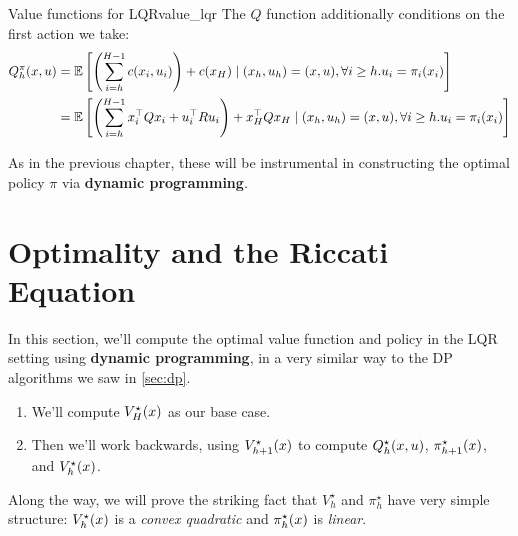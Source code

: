\documentclass[\main/main]{subfiles}
\begin{document}
\begin{definition}{Value functions for LQR}{value_lqr}
    The $Q$ function additionally conditions on the first
    action we take:
    \[
        \begin{split}
            Q^\pi_h (x, u) &= \operatorname*{\mathbb{E}} \left[ \left( \sum_{i=h}^{H-1} c(x_i, u_i) \right) + c(x_H) \mid  (x_h, u_h) = (x, u), \forall i \ge h. u_i = \pi_i(x_i) \right] \\
            &= \operatorname*{\mathbb{E}} \left[ \left( \sum_{i=h}^{H-1} x_i^\top Q x_i + u_i^\top R u_i \right) + x_H^\top Q x_H \mid (x_h, u_h) = (x, u), \forall i \ge h. u_i = \pi_i(x_i) \right] \\
        \end{split}
    \]
\end{definition}

As in the previous chapter, these will be instrumental in constructing the optimal policy $\pi$ via \textbf{dynamic programming}.

\section{Optimality and the Riccati Equation} \label{sec:optimal_lqr}

In this section, we'll compute the optimal value function and policy in the LQR setting using \textbf{dynamic programming}, in a very similar way to the DP algorithms we saw in \autoref{sec:dp}. %
\begin{enumerate}
    \item We'll compute $V_H^\star(x)$ as our base case.
    \item Then we'll work backwards, using $V_{h+1}^\star(x)$ to compute $Q_h^\star(x, u)$, $\pi_{h+1}^\star(x)$, and $V_h^\star(x)$.
\end{enumerate}
Along the way, we will prove the striking fact that $V_h^\star$ and $\pi_h^\star$ have very simple structure: $V_h^\star(x)$ is a \emph{convex quadratic} and $\pi_h^\star(x)$ is \emph{linear}.
\end{document}
